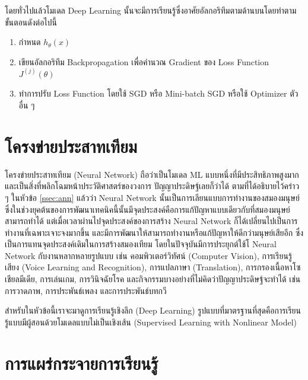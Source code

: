 โดยทั่วไปแล้วโมเดล Deep Learning นั้นจะมีการเรียนรู้ซึ่งอาศัยอัลกอริทึมตามด้านบนโดยทำตามขั้นตอนดังต่อไปนี้

\begin{enumerate}
    \item กำหนด $h_\theta(x)$
    
    \item เขียนอัลกอริทึม Backpropagation เพื่อคำนวณ Gradient ของ Loss Function $J^{(j)}(\theta)$
    
    \item ทำการปรับ Loss Function โดยใช้ SGD หรือ Mini-batch SGD หรือใช้ Optimizer ตัวอื่น ๆ
\end{enumerate}

\section{โครงข่ายประสาทเทียม}
\label{sec:nn}

โครงข่ายประสาทเทียม (Neural Network) ถือว่าเป็นโมเดล ML แบบหนึ่งที่มีประสิทธิภาพสูงมากและเป็นสิ่งที่พลิกโฉมหน้าประวัติศาสตร์ของวงการ%
ปัญญาประดิษฐ์เลยก็ว่าได้ ตามที่ได้อธิบายไว้คร่าว ๆ ในหัวข้อ \ref{ssec:ann} แล้วว่า Neural Network นั้นเป็นการเลียนแบบการทำงานของสมองมนุษย์ 
ซึ่งในช่วงยุคต้นของการพัฒนาเทคนิคนี้นั้นมีจุดประสงค์คือการแก้ปัญหาแบบเดียวกับที่สมองมนุษย์สามารถทำได้ แต่เมื่อเวลาผ่านไปจุดประสงค์ของการสร้าง
Neural Network ก็ได้เปลี่ยนไปเป็นการทำงานที่เฉพาะเจาะจงมากขึ้น และมีการพัฒนาให้สามารถทำงานหรือแก้ปัญหาให้ดีกว่ามนุษย์เสียอีก 
ซึ่งเป็นการแทนจุดประสงค์เดิมในการสร้างสมองเทียม โดยในปัจจุบันมีการประยุกต์ใช้โ Neural Network กับงานหลากหลายรูปแบบ เช่น คอมพิวเตอร์วิทัศน์ 
(Computer Vision), การเรียนรู้เสียง (Voice Learning and Recognition), การแปลภาษา (Translation), การกรองเนื้อหาโซเชียลมีเดีย, 
การเล่นเกม, การวินิจฉัยโรค และกิจกรรมบางอย่างที่ไม่คิดว่าปัญญาประดิษฐ์จะทำได้ เช่น การวาดภาพ, การประพันธ์เพลง และการประพันธ์บทกวี

สำหรับในหัวข้อนี้เราจะมาดูการเรียนรู้เชิงลึก (Deep Learning) รูปแบบที่มาตรฐานที่สุดคือการเรียนรู้แบบมีผู้สอนด้วยโมเดลแบบไม่เป็นเชิงเส้น 
(Supervised Learning with Nonlinear Model)

\section{การแผร่กระจายการเรียนรู้}

